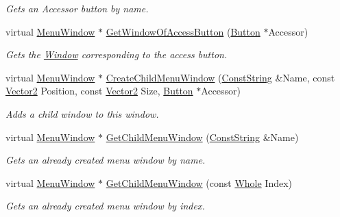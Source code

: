 \begin{DoxyCompactItemize}
\begin{DoxyCompactList}\small\item\em Gets an Accessor button by name. \item\end{DoxyCompactList}\item 
virtual \hyperlink{classphys_1_1UI_1_1MenuWindow}{MenuWindow} $\ast$ \hyperlink{classphys_1_1UI_1_1MenuWindow_a12b1586cd33bc03b5902018376878961}{GetWindowOfAccessButton} (\hyperlink{classphys_1_1UI_1_1Button}{Button} $\ast$Accessor)
\begin{DoxyCompactList}\small\item\em Gets the \hyperlink{classphys_1_1UI_1_1Window}{Window} corresponding to the access button. \item\end{DoxyCompactList}\item 
virtual \hyperlink{classphys_1_1UI_1_1MenuWindow}{MenuWindow} $\ast$ \hyperlink{classphys_1_1UI_1_1MenuWindow_a5b4945e253037695a8ea7d09560dd9d8}{CreateChildMenuWindow} (\hyperlink{namespacephys_a5ce5049f8b4bf88d6413c47b504ebb31}{ConstString} \&Name, const \hyperlink{classphys_1_1Vector2}{Vector2} Position, const \hyperlink{classphys_1_1Vector2}{Vector2} Size, \hyperlink{classphys_1_1UI_1_1Button}{Button} $\ast$Accessor)
\begin{DoxyCompactList}\small\item\em Adds a child window to this window. \item\end{DoxyCompactList}\item 
virtual \hyperlink{classphys_1_1UI_1_1MenuWindow}{MenuWindow} $\ast$ \hyperlink{classphys_1_1UI_1_1MenuWindow_ad1136c4e4b2ff9b9dc5d6aac2dba45a7}{GetChildMenuWindow} (\hyperlink{namespacephys_a5ce5049f8b4bf88d6413c47b504ebb31}{ConstString} \&Name)
\begin{DoxyCompactList}\small\item\em Gets an already created menu window by name. \item\end{DoxyCompactList}\item 
virtual \hyperlink{classphys_1_1UI_1_1MenuWindow}{MenuWindow} $\ast$ \hyperlink{classphys_1_1UI_1_1MenuWindow_a528d6397f8799219793978c70a26c22c}{GetChildMenuWindow} (const \hyperlink{namespacephys_a460f6bc24c8dd347b05e0366ae34f34a}{Whole} Index)
\begin{DoxyCompactList}\small\item\em Gets an already created menu window by index. \item\end{DoxyCompactList}\item 

\end{DoxyCompactItemize}
